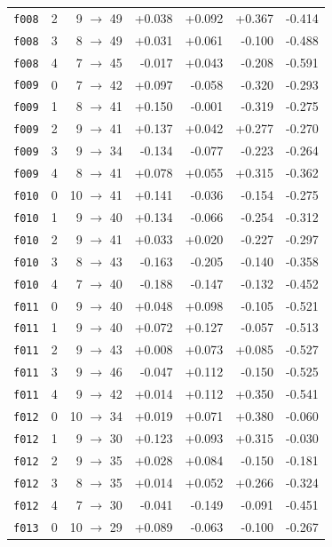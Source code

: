 \documentclass[11pt]{article}
\begin{document}
\begin{table}[htbp]
\begin{tabular}{llrrrrr}
\texttt{f008} & 2 & 9 $\to$ 49 & +0.038 & +0.092 & +0.367 & -0.414 \\
\texttt{f008} & 3 & 8 $\to$ 49 & +0.031 & +0.061 & -0.100 & -0.488 \\
\texttt{f008} & 4 & 7 $\to$ 45 & -0.017 & +0.043 & -0.208 & -0.591 \\
\texttt{f009} & 0 & 7 $\to$ 42 & +0.097 & -0.058 & -0.320 & -0.293 \\
\texttt{f009} & 1 & 8 $\to$ 41 & +0.150 & -0.001 & -0.319 & -0.275 \\
\texttt{f009} & 2 & 9 $\to$ 41 & +0.137 & +0.042 & +0.277 & -0.270 \\
\texttt{f009} & 3 & 9 $\to$ 34 & -0.134 & -0.077 & -0.223 & -0.264 \\
\texttt{f009} & 4 & 8 $\to$ 41 & +0.078 & +0.055 & +0.315 & -0.362 \\
\texttt{f010} & 0 & 10 $\to$ 41 & +0.141 & -0.036 & -0.154 & -0.275 \\
\texttt{f010} & 1 & 9 $\to$ 40 & +0.134 & -0.066 & -0.254 & -0.312 \\
\texttt{f010} & 2 & 9 $\to$ 41 & +0.033 & +0.020 & -0.227 & -0.297 \\
\texttt{f010} & 3 & 8 $\to$ 43 & -0.163 & -0.205 & -0.140 & -0.358 \\
\texttt{f010} & 4 & 7 $\to$ 40 & -0.188 & -0.147 & -0.132 & -0.452 \\
\texttt{f011} & 0 & 9 $\to$ 40 & +0.048 & +0.098 & -0.105 & -0.521 \\
\texttt{f011} & 1 & 9 $\to$ 40 & +0.072 & +0.127 & -0.057 & -0.513 \\
\texttt{f011} & 2 & 9 $\to$ 43 & +0.008 & +0.073 & +0.085 & -0.527 \\
\texttt{f011} & 3 & 9 $\to$ 46 & -0.047 & +0.112 & -0.150 & -0.525 \\
\texttt{f011} & 4 & 9 $\to$ 42 & +0.014 & +0.112 & +0.350 & -0.541 \\
\texttt{f012} & 0 & 10 $\to$ 34 & +0.019 & +0.071 & +0.380 & -0.060 \\
\texttt{f012} & 1 & 9 $\to$ 30 & +0.123 & +0.093 & +0.315 & -0.030 \\
\texttt{f012} & 2 & 9 $\to$ 35 & +0.028 & +0.084 & -0.150 & -0.181 \\
\texttt{f012} & 3 & 8 $\to$ 35 & +0.014 & +0.052 & +0.266 & -0.324 \\
\texttt{f012} & 4 & 7 $\to$ 30 & -0.041 & -0.149 & -0.091 & -0.451 \\
\texttt{f013} & 0 & 10 $\to$ 29 & +0.089 & -0.063 & -0.100 & -0.267 \\

\end{tabular}
\end{table}
\end{document}
